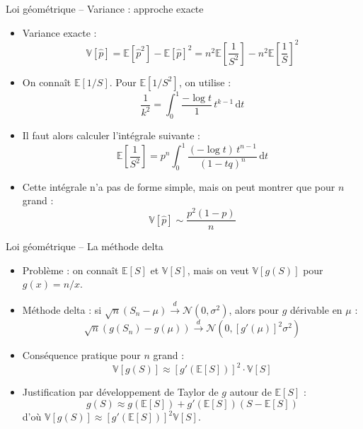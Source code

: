 \documentclass[11pt,aspectratio=169]{beamer}
\newcommand{\dd}{\mathrm{d}}
\begin{document}
\begin{frame}{Loi géométrique -- Variance : approche exacte}

\begin{itemize}

\item Variance exacte :
  \[
  \mathbb{V}[\hat{p}] = \mathbb{E}[\hat{p}^2] - \mathbb{E}[\hat{p}]^2 = n^2 \mathbb{E}\left[\frac{1}{S^2}\right] - n^2 \mathbb{E}\left[\frac{1}{S}\right]^2
  \]

\item On connaît $\mathbb{E}[1/S]$. Pour $\mathbb{E}[1/S^2]$, on utilise :
  \[
  \frac{1}{k^2} = \int_0^1 \frac{-\log t}{1} \, t^{k-1} \, \dd t
  \]

\item Il faut alors calculer l'intégrale suivante :
  \[
  \mathbb{E}\left[\frac{1}{S^2}\right] = p^n \int_0^1 \frac{(-\log t) \, t^{n-1}}{(1-tq)^n} \, \dd t
  \]

\item Cette intégrale n'a pas de forme simple, mais on peut montrer que pour $n$ grand :
  \[
  \mathbb{V}[\hat{p}] \sim \frac{p^2(1-p)}{n}
  \]

\end{itemize}

\end{frame}


\begin{frame}{Loi géométrique -- La méthode delta}

\begin{itemize}

\item Problème : on connaît $\mathbb{E}[S]$ et $\mathbb{V}[S]$, mais on veut $\mathbb{V}[g(S)]$ pour $g(x) = n/x$.\newline

\item Méthode delta : si $\sqrt{n}(S_n - \mu) \xrightarrow{d} \mathcal{N}(0, \sigma^2)$, alors pour $g$ dérivable en $\mu$ :
  \[
  \sqrt{n}(g(S_n) - g(\mu)) \xrightarrow{d} \mathcal{N}(0, [g'(\mu)]^2 \sigma^2)
  \]

\item Conséquence pratique pour $n$ grand :
  \[
  \boxed{\mathbb{V}[g(S)] \approx [g'(\mathbb{E}[S])]^2 \cdot \mathbb{V}[S]}
  \]

\item Justification par développement de Taylor de $g$ autour de $\mathbb{E}[S]$ :
  \[
  g(S) \approx g(\mathbb{E}[S]) + g'(\mathbb{E}[S])(S - \mathbb{E}[S])
  \]
  d'où $\mathbb{V}[g(S)] \approx [g'(\mathbb{E}[S])]^2 \mathbb{V}[S]$.

\end{itemize}

\end{frame}
\end{document}

